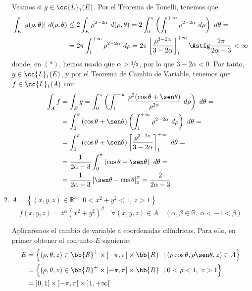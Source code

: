 \begin{ejercicio}
\begin{enumerate}
        Veamos si $g\in \cc{L}_1(E)$. Por el Teorema de Tonelli, tenemos que:
        \begin{align*}
            \int_E |g(\rho, \theta)|~d(\rho, \theta)
            &\leq 2\int_E \rho^{2-2\alpha}~d(\rho, \theta)
            = 2\int_0^\pi \left( \int_1^{+\infty} \rho^{2-2\alpha}~d\rho \right)~d\theta
            =\\&= 2\pi \int_1^{+\infty} \rho^{2-2\alpha}~d\rho
            = 2\pi \left[ \frac{\rho^{3-2\alpha}}{3-2\alpha} \right]_1^{+\infty}
            \AstIg \frac{2\pi}{2\alpha-3} < \infty
        \end{align*}
        donde, en $(\ast)$, hemos usado que $\alpha > \nicefrac{3}{2}$, por lo que $3-2\alpha < 0$.
        Por tanto, $g\in \cc{L}_1(E)$, y por el Teorema de Cambio de Variable, tenemos que $f\in \cc{L}_1(A)$ con:
        \begin{align*}
            \int_A f &= \int_E g = \int_0^\pi \left( \int_1^{+\infty} \frac{\rho^2(\cos\theta + \sen\theta)}{\rho^{2\alpha}}~d\rho \right)~d\theta =\\
            &= \int_0^\pi \left( \cos\theta + \sen\theta \right) \left( \int_1^{+\infty} \rho^{2-2\alpha}~d\rho \right)~d\theta =\\
            &= \int_0^\pi \left( \cos\theta + \sen\theta \right) \left[ \frac{\rho^{3-2\alpha}}{3-2\alpha} \right]_1^{+\infty}~d\theta =\\
            &= \frac{1}{2\alpha-3} \int_0^\pi \left( \cos\theta + \sen\theta \right) ~d\theta =\\
            &= \frac{1}{2\alpha-3} \left[ \sen\theta - \cos\theta \right]_0^\pi = \frac{2}{2\alpha-3}
        \end{align*}

        \item \( A = \left\{ (x, y, z) \in \mathbb{R}^3 \mid 0 < x^2 + y^2 < 1 ,~z > 1 \right\} \)
        \[ f(x, y, z) = z^\alpha (x^2 + y^2)^\beta \quad \forall (x, y, z) \in A \quad (\alpha, \beta \in \mathbb{R},~\alpha < -1 < \beta) \]

        Aplicaremos el cambio de variable a coordenadas cilíndricas. Para ello, en primer
        obtener el conjunto $E$ siguiente:
        \begin{align*}
            E &= \left\{ (\rho, \theta, z) \in \bb{R}^+\times \left]-\pi, \pi\right[ \times \bb{R} ~\mid (\rho\cos\theta, \rho\sen\theta, z) \in A \right\} \\
            &= \left\{ (\rho, \theta, z) \in \bb{R}^+\times \left]-\pi, \pi\right[ \times \bb{R} ~\mid 0 < \rho < 1 ,~z > 1 \right\} \\
            &= \left] 0, 1 \right[ \times \left] -\pi, \pi \right[ \times \left] 1, +\infty \right[
        \end{align*}


\end{enumerate}
\end{ejercicio}
